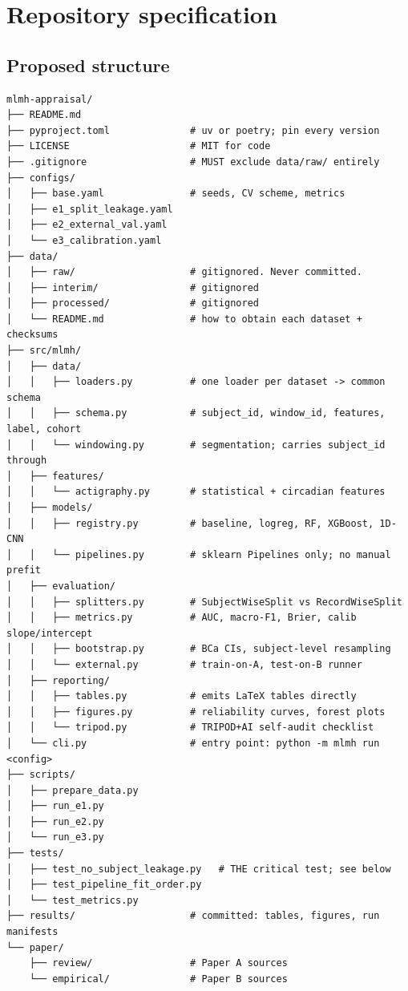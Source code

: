 \documentclass[11pt,a4paper]{article}
\begin{document}
\section{Repository specification}

\subsection{Proposed structure}

\begin{lstlisting}
mlmh-appraisal/
├── README.md
├── pyproject.toml              # uv or poetry; pin every version
├── LICENSE                     # MIT for code
├── .gitignore                  # MUST exclude data/raw/ entirely
├── configs/
│   ├── base.yaml               # seeds, CV scheme, metrics
│   ├── e1_split_leakage.yaml
│   ├── e2_external_val.yaml
│   └── e3_calibration.yaml
├── data/
│   ├── raw/                    # gitignored. Never committed.
│   ├── interim/                # gitignored
│   ├── processed/              # gitignored
│   └── README.md               # how to obtain each dataset + checksums
├── src/mlmh/
│   ├── data/
│   │   ├── loaders.py          # one loader per dataset -> common schema
│   │   ├── schema.py           # subject_id, window_id, features, label, cohort
│   │   └── windowing.py        # segmentation; carries subject_id through
│   ├── features/
│   │   └── actigraphy.py       # statistical + circadian features
│   ├── models/
│   │   ├── registry.py         # baseline, logreg, RF, XGBoost, 1D-CNN
│   │   └── pipelines.py        # sklearn Pipelines only; no manual prefit
│   ├── evaluation/
│   │   ├── splitters.py        # SubjectWiseSplit vs RecordWiseSplit
│   │   ├── metrics.py          # AUC, macro-F1, Brier, calib slope/intercept
│   │   ├── bootstrap.py        # BCa CIs, subject-level resampling
│   │   └── external.py         # train-on-A, test-on-B runner
│   ├── reporting/
│   │   ├── tables.py           # emits LaTeX tables directly
│   │   ├── figures.py          # reliability curves, forest plots
│   │   └── tripod.py           # TRIPOD+AI self-audit checklist
│   └── cli.py                  # entry point: python -m mlmh run <config>
├── scripts/
│   ├── prepare_data.py
│   ├── run_e1.py
│   ├── run_e2.py
│   └── run_e3.py
├── tests/
│   ├── test_no_subject_leakage.py   # THE critical test; see below
│   ├── test_pipeline_fit_order.py
│   └── test_metrics.py
├── results/                    # committed: tables, figures, run manifests
└── paper/
    ├── review/                 # Paper A sources
    └── empirical/              # Paper B sources
\end{lstlisting}
\end{document}
